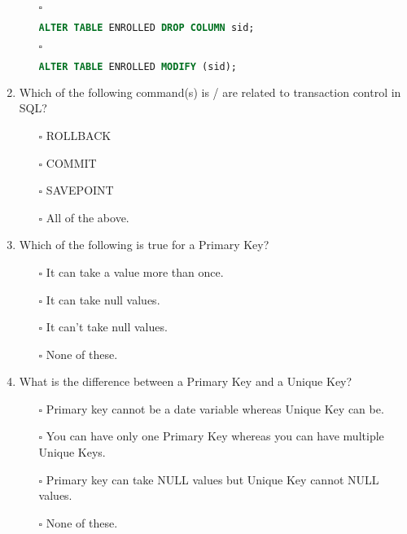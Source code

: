 \documentclass[10pt]{article}
\begin{document}
\begin{enumerate}
\begin{enumerate}
					\item[$\square$]
						\begin{lstlisting}[language=SQL,firstline=1, lastline=1, numbers = right] 
							ALTER TABLE ENROLLED DROP COLUMN sid;
						\end{lstlisting}
					
					\item[$\square$]
						\begin{lstlisting}[language=SQL,firstline=1, lastline=1, numbers = right] 
							ALTER TABLE ENROLLED MODIFY (sid);
						\end{lstlisting}
				\end{enumerate}

			\newpage	

			\item Which of the following command(s) is /  are related to transaction control in SQL?
				\begin{enumerate}
					\item[$\square$] ROLLBACK
					\item[$\square$] COMMIT
					\item[$\square$] SAVEPOINT
					\item[$\square$] All of the above.
				\end{enumerate}

			\item Which of the following is true for a Primary Key?
				\begin{enumerate}
					\item[$\square$] It can take a value more than once.
					\item[$\square$] It can take null values.
					\item[$\square$] It can’t take null values.
					\item[$\square$] None of these.
				\end{enumerate}

			\item What is the difference between a Primary Key and a Unique Key?
				\begin{enumerate}
					\item[$\square$] Primary key cannot be a date variable whereas Unique Key can be.
					\item[$\square$] You can have only one Primary Key whereas you can have multiple Unique Keys.
					\item[$\square$] Primary key can take NULL values but Unique Key cannot NULL values.
					\item[$\square$] None of these.
				\end{enumerate}


\end{enumerate}
\end{document}
